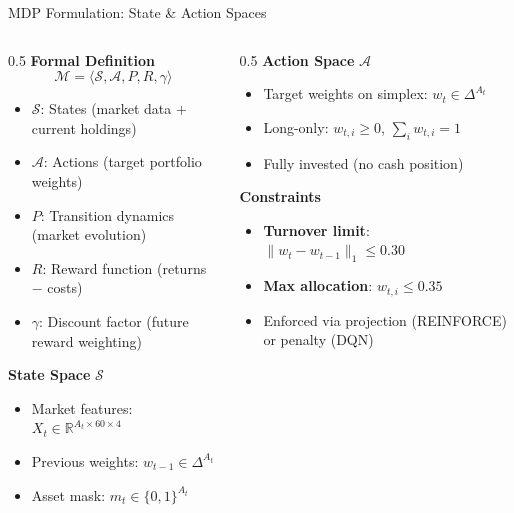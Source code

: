 \documentclass[aspectratio=169]{beamer}
\begin{document}
\begin{frame}{MDP Formulation: State \& Action Spaces}
\small

\begin{columns}[T,totalwidth=\textwidth]
\begin{column}{0.5\textwidth}
\textbf{Formal Definition}
\[
\mathcal{M} = \langle \mathcal{S}, \mathcal{A}, P, R, \gamma \rangle
\]
\vspace{-0.3em}
\scriptsize
\begin{itemize}\setlength{\itemsep}{1pt}
  \item $\mathcal{S}$: States (market data + current holdings)
  \item $\mathcal{A}$: Actions (target portfolio weights)
  \item $P$: Transition dynamics (market evolution)
  \item $R$: Reward function (returns $-$ costs)
  \item $\gamma$: Discount factor (future reward weighting)
\end{itemize}
\small

\vspace{0.4em}
\textbf{State Space} $\mathcal{S}$
\begin{itemize}\setlength{\itemsep}{3pt}
  \item Market features: $X_t \in \mathbb{R}^{A_t \times 60 \times 4}$
  \item Previous weights: $w_{t-1} \in \Delta^{A_t}$
  \item Asset mask: $m_t \in \{0,1\}^{A_t}$
\end{itemize}
\end{column}

\begin{column}{0.5\textwidth}
\textbf{Action Space} $\mathcal{A}$
\begin{itemize}\setlength{\itemsep}{3pt}
  \item Target weights on simplex: $w_t \in \Delta^{A_t}$
  \item Long-only: $w_{t,i} \geq 0$, $\sum_i w_{t,i} = 1$
  \item Fully invested (no cash position)
\end{itemize}

\vspace{0.5em}
\textbf{Constraints}
\begin{itemize}\setlength{\itemsep}{3pt}
  \item \textbf{Turnover limit}: $\|w_t - w_{t-1}\|_1 \leq 0.30$
  \item \textbf{Max allocation}: $w_{t,i} \leq 0.35$
  \item Enforced via projection (REINFORCE) or penalty (DQN)
\end{itemize}
\end{column}
\end{columns}

\end{frame}
\end{document}
